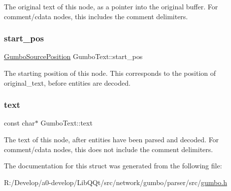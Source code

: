 The original text of this node, as a pointer into the original buffer. For comment/cdata nodes, this includes the comment delimiters. \mbox{\label{struct_gumbo_text_a7ed506026827c272bb36bd85a5321674}} 
\subsubsection{\texorpdfstring{start\+\_\+pos}{start\_pos}}
{\footnotesize\ttfamily \mbox{\hyperlink{struct_gumbo_source_position}{Gumbo\+Source\+Position}} Gumbo\+Text\+::start\+\_\+pos}

The starting position of this node. This corresponds to the position of original\+\_\+text, before entities are decoded. \mbox{\label{struct_gumbo_text_a6a992fb516fc59546a630714d1704747}} 
\subsubsection{\texorpdfstring{text}{text}}
{\footnotesize\ttfamily const char$\ast$ Gumbo\+Text\+::text}

The text of this node, after entities have been parsed and decoded. For comment/cdata nodes, this does not include the comment delimiters. 

The documentation for this struct was generated from the following file\+:\begin{DoxyCompactItemize}
\item 
R\+:/\+Develop/a0-\/develop/\+Lib\+Q\+Qt/src/network/gumbo/parser/src/\mbox{\hyperlink{gumbo_8h}{gumbo.\+h}}\end{DoxyCompactItemize}
